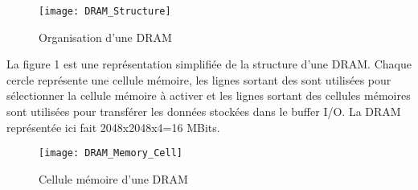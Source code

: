 \begin{itemize}
	      \begin{figure}[H]
	      	\begin{center}
	      		\texttt{[image: DRAM\_Structure]}
	      	\end{center}
	      	\caption{Organisation d'une DRAM}
	      \end{figure}
	      	                  
	      La figure 1 est une représentation simplifiée de la structure d'une DRAM.
	      Chaque cercle représente une cellule mémoire, les lignes sortant des  sont utilisées pour sélectionner la cellule mémoire à activer et les lignes sortant des cellules mémoires sont utilisées pour transférer les données stockées dans le buffer I/O.
	      La DRAM représentée ici fait 2048x2048x4=16 MBits. \\
	      	                  
	      \begin{figure}[H]
	      	\begin{center}
	      		\texttt{[image: DRAM\_Memory\_Cell]}
	      	\end{center}
	      	\caption{Cellule mémoire d'une DRAM}
	      \end{figure}
	      	                  

\end{itemize}
